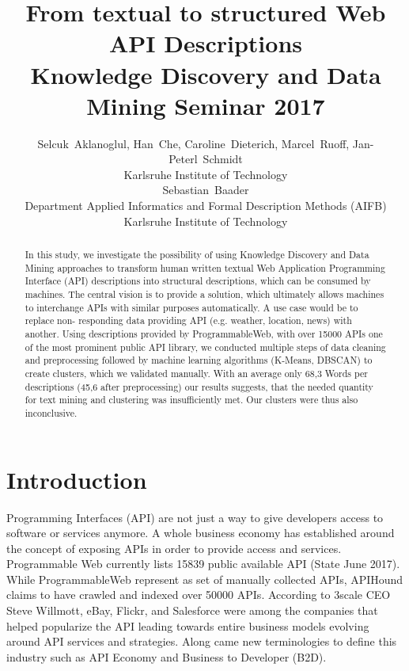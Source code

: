 \documentclass[a4paper]{IEEEtran}
\begin{document}
\title{From textual to structured Web API Descriptions\\ \large Knowledge Discovery and Data Mining Seminar 2017 }


\author{Selcuk~Aklanoglul,
        Han~Che,
        Caroline~Dieterich,
        Marcel~Ruoff,
        Jan-Peterl~Schmidt  \\
Karlsruhe Institute of Technology \\
Sebastian~Baader \\
Department Applied Informatics and  Formal Description Methods (AIFB)  \\
Karlsruhe Institute of Technology

}



\maketitle

\begin{abstract}
In this study, we investigate the possibility of using Knowledge Discovery and Data Mining approaches to transform human written textual Web Application Programming Interface
(API) descriptions into structural descriptions, which
can be consumed by machines. The central vision
is to provide a solution, which ultimately allows
machines to interchange APIs with similar purposes
automatically. A use case would be to replace non-
responding data providing API (e.g. weather,
location, news) with another. Using descriptions
provided by ProgrammableWeb, with over 15000
APIs one of the most prominent public API library,
we conducted multiple steps of data cleaning and
preprocessing followed by machine learning
algorithms (K-Means, DBSCAN) to create clusters,
which we validated manually. With an average only
68,3 Words per descriptions (45,6 after
preprocessing) our results suggests, that the
needed quantity for text mining and clustering was insufficiently met. Our clusters were thus also
inconclusive.
\end{abstract}


\IEEEpeerreviewmaketitle

\section{Introduction}
 Programming Interfaces (API) are not just a way to give developers access to software or services anymore. A whole business economy has established around the concept of exposing APIs in order to provide access and services. Programmable Web currently lists 15839 public available API (State June 2017). While ProgrammableWeb represent as set of manually collected APIs, APIHound claims to have crawled and indexed over 50000 APIs.
According to 3scale CEO Steve Willmott, eBay, Flickr, and Salesforce were among the companies that helped popularize the API \cite{tmcnet} leading towards entire business models evolving around API services and strategies. Along came new terminologies to define this industry such as API Economy and Business to Developer (B2D).
\end{document}
